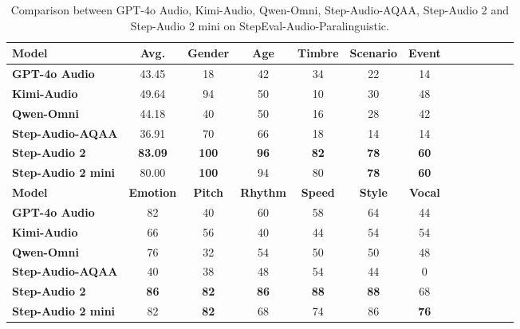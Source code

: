 \begin{table}[h]
\caption{Comparison between GPT-4o Audio, Kimi-Audio, Qwen-Omni, Step-Audio-AQAA, Step-Audio 2 and Step-Audio 2 mini on StepEval-Audio-Paralinguistic.}
\label{tab:paralinguistic-7b}
\centering
\begin{tabular}{lcccccccccccc}
\toprule
\textbf{Model} &\textbf{Avg.} &\textbf{Gender} & \textbf{Age} & \textbf{Timbre} & \textbf{Scenario} & \textbf{Event}  \\
\midrule
\textbf{GPT-4o Audio} & 43.45 & 18 & 42 & 34 & 22 & 14 \\
\textbf{Kimi-Audio} & 49.64 & 94 & 50 & 10 & 30 & 48 \\
\textbf{Qwen-Omni} & 44.18 & 40 & 50 & 16 & 28 & 42  \\
\textbf{Step-Audio-AQAA} & 36.91 & 70 & 66 & 18 & 14 & 14  \\
\textbf{Step-Audio 2} & \textbf{83.09} & \textbf{100} & \textbf{96} & \textbf{82} & \textbf{78} & \textbf{60} \\
\textbf{Step-Audio 2 mini} & 80.00 & \textbf{100} & 94 & 80 & \textbf{78} & \textbf{60} \\
\midrule
\textbf{Model} &\textbf{Emotion} & \textbf{Pitch} & \textbf{Rhythm} & \textbf{Speed} & \textbf{Style} & \textbf{Vocal} \\
\midrule
\textbf{GPT-4o Audio} & 82 & 40 & 60 & 58 & 64 & 44  \\
\textbf{Kimi-Audio} & 66 & 56 & 40 & 44 & 54 & 54 \\
\textbf{Qwen-Omni} & 76 & 32 & 54 & 50 & 50 & 48 \\
\textbf{Step-Audio-AQAA} & 40 & 38 & 48 & 54 & 44 & 0  \\
\textbf{Step-Audio 2} & \textbf{86} & \textbf{82} & \textbf{86} & \textbf{88} & \textbf{88} & 68 \\
\textbf{Step-Audio 2 mini} & 82 & \textbf{82} & 68 & 74 & 86 & \textbf{76} \\
\bottomrule
\end{tabular}
\end{table}


